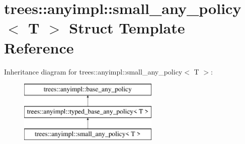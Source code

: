 \hypertarget{structtrees_1_1anyimpl_1_1small__any__policy}{}\section{trees\+:\+:anyimpl\+:\+:small\+\_\+any\+\_\+policy$<$ T $>$ Struct Template Reference}
\label{structtrees_1_1anyimpl_1_1small__any__policy}
Inheritance diagram for trees\+:\+:anyimpl\+:\+:small\+\_\+any\+\_\+policy$<$ T $>$\+:\begin{figure}[H]
\begin{center}
\leavevmode
\includegraphics[height=3.000000cm]{structtrees_1_1anyimpl_1_1small__any__policy}
\end{center}
\end{figure}
